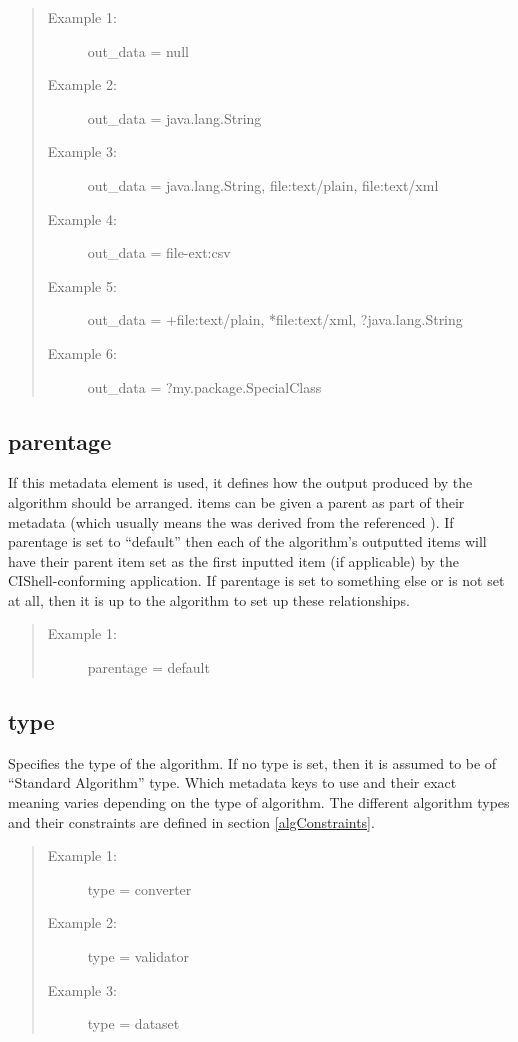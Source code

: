 \begin{quote}
\begin{description}
  \item[Example 1:] out\_data = null
  \item[Example 2:] out\_data = java.lang.String
  \item[Example 3:] out\_data = java.lang.String, file:text/plain, file:text/xml
  \item[Example 4:] out\_data = file-ext:csv
  \item[Example 5:] out\_data = +file:text/plain, *file:text/xml,
  ?java.lang.String
  \item[Example 6:] out\_data = ?my.package.SpecialClass
\end{description}
\end{quote}


\subsection*{parentage}
If this metadata element is used, it defines how the output 
produced by the algorithm should be arranged.  items can be given a parent as
part of their metadata (which usually means the  was derived from
the referenced ). If parentage is set to ``default'' then each of the
algorithm's outputted  items will have their parent  item
set as the first inputted  item (if applicable) by the
CIShell-conforming application. If parentage is set to something else or is not
set at all, then it is up to the algorithm to set up these relationships.

\begin{quote}
\begin{description}
  \item[Example 1:] parentage = default 
\end{description}
\end{quote}


\subsection*{type} 
Specifies the type of the algorithm. If no type is set, then
it is assumed to be of ``Standard Algorithm'' type. Which metadata keys to use
and their exact meaning varies depending on the type of algorithm. The different
algorithm types and their constraints are defined in section
\ref{algConstraints}.

\begin{quote}
\begin{description}
  \item[Example 1:] type = converter
  \item[Example 2:] type = validator
  \item[Example 3:] type = dataset 
\end{description}
\end{quote}


